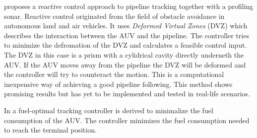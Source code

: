	\cite{reactive_control_AUV} proposes a reactive control approach to pipeline tracking together with a profiling sonar. Reactive control originated from the field of obstacle avoidance in autonomous land and air vehicles. It uses \textit{Deformed Virtual Zones} (DVZ) which describes the interaction between the AUV and the pipeline. The controller tries to minimize the defromation of the DVZ and calculates a feasible control input. The DVZ in this case is a prism with a cylidrical cavity directly underneth the AUV. If the AUV moves away from the pipeline the DVZ will be deformed and the controller will try to counteract the motion. This is a computational inexpensive way of achieving a good pipeline following. This method shows promising results but has yet to be implemented and tested in real-life scenarios. 
	
	In \cite{fuel_optimal_control} a fuel-optimal tracking controller is derived to minimalize the fuel consumption of the AUV. The controller minimizes the fuel consumption needed to reach the terminal position. 

